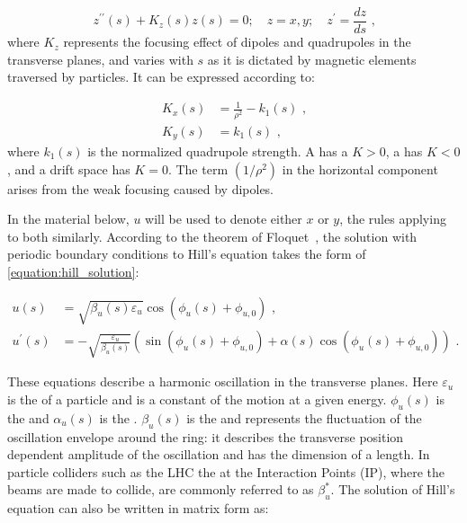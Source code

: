 \begin{equation}
    z^{\prime \prime}(s) + K_z(s) z(s) = 0; \quad z = x, y; \quad z^{\prime} = \dfrac{dz}{ds} \text{ ,}
    \label{equation:hill_equation}
\end{equation}
where \(K_z\) represents the focusing effect of dipoles and quadrupoles in the transverse planes, and varies with \(s\) as it is dictated by magnetic elements traversed by particles.
It can be expressed according to:

\begin{equation}
	\begin{aligned}
		K_x(s) &= \frac{1}{\rho^2} - k_1(s) \text{ ,} \\
    	K_y(s) &= k_1(s) \text{ ,}
	\end{aligned}
    \label{equation:transverse_focusing_strengths}
\end{equation}
where \(k_1(s)\) is the normalized quadrupole strength.
A  has a \(K > 0\), a  has \(K < 0\), and a drift space has \(K = 0\).
The term \(\left(1 / \rho^2\right)\) in the horizontal component arises from the weak focusing caused by dipoles.

In the material below, \(u\) will be used to denote either \(x\) or \(y\), the rules applying to both similarly.
According to the theorem of Floquet~\cite{BOOK:Lee:Accelerator_physics}, the solution with periodic boundary conditions to Hill’s equation takes the form of \cref{equation:hill_solution}:

\begin{equation}
    \begin{aligned}
        u(s)          &= \sqrt{\beta_{u}(s) \varepsilon_{u}} \cos \left( \phi_{u}(s) + \phi_{u,0} \right) \text{ ,} \\
        u^{\prime}(s) &= -\sqrt{\frac{\varepsilon_u}{\beta_u(s)}} \left( \sin \left(\phi_u(s) + \phi_{u, 0} \right) + \alpha(s) \cos \left( \phi_u(s)+\phi_{u, 0} \right) \right) \text{ .}
    \end{aligned}
    \label{equation:hill_solution}
\end{equation}

These equations describe a harmonic oscillation in the transverse planes.
Here \(\varepsilon_u\) is the  of a particle and is a constant of the motion at a given energy. 
\(\phi_u(s)\) is the  and \(\alpha_u(s)\) is the .
\(\beta_u(s)\) is the  and represents the fluctuation of the oscillation envelope around the ring: it describes the transverse position dependent amplitude of the oscillation and has the dimension of a length.
In particle colliders such as the LHC the \betafunctions at the Interaction Points (IP), where the beams are made to collide, are commonly referred to as \(\beta_u^{\ast}\).
The solution of Hill's equation can also be written in matrix form as:

